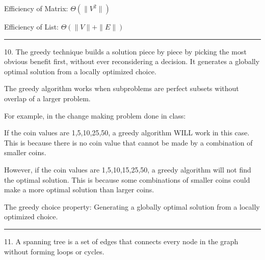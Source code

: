 \documentclass{article}
\begin{document}
Efficiency of Matrix: $\Theta(\|V^2\|)$

Efficiency of List: $\Theta(\|V\|+  \|E\|)$

\noindent\rule{8cm}{0.4pt}


10. The greedy technique builds a solution piece by piece by picking the most obvious benefit first, without ever reconsidering a decision. It generates a globally optimal solution from a locally optimized choice. 

The greedy algorithm works when subproblems are perfect subsets without overlap of a larger problem. 

For example, in the change making problem done in class:

If the coin values are 1,5,10,25,50, a greedy algorithm WILL work in this case. This is because there is no coin value that cannot be made by a combination of smaller coins. 


However, if the coin values are 1,5,10,15,25,50, a greedy algorithm will not find the optimal solution. This is because some combinations of smaller coins could make a more optimal solution than larger coins. 

The greedy choice property: Generating a globally optimal solution from a locally optimized choice. 




\noindent\rule{8cm}{0.4pt}

11. A spanning tree is a set of edges that connects every node in the graph without forming loops or cycles. 
\end{document}
